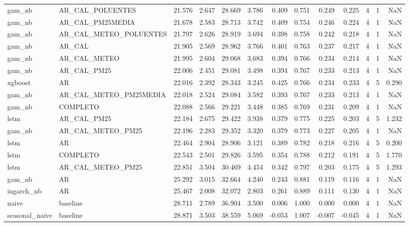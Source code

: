 \begin{tabular}{llrrrrrrrrrrr}
gam_nb & AR_CAL_POLUENTES & 21.576 & 2.647 & 28.669 & 3.786 & 0.409 & 0.751 & 0.249 & 0.225 & 4 & 1 & NaN \\
gam_nb & AR_CAL_PM25MEDIA & 21.678 & 2.583 & 28.713 & 3.742 & 0.409 & 0.754 & 0.246 & 0.224 & 4 & 1 & NaN \\
gam_nb & AR_CAL_METEO_POLUENTES & 21.797 & 2.626 & 28.919 & 3.694 & 0.398 & 0.758 & 0.242 & 0.218 & 4 & 1 & NaN \\
gam_nb & AR_CAL & 21.905 & 2.569 & 28.962 & 3.766 & 0.401 & 0.763 & 0.237 & 0.217 & 4 & 1 & NaN \\
gam_nb & AR_CAL_METEO & 21.995 & 2.604 & 29.068 & 3.683 & 0.394 & 0.766 & 0.234 & 0.214 & 4 & 1 & NaN \\
gam_nb & AR_CAL_PM25 & 22.006 & 2.451 & 29.081 & 3.498 & 0.394 & 0.767 & 0.233 & 0.213 & 4 & 1 & NaN \\
xgboost & AR & 22.016 & 2.392 & 28.343 & 3.245 & 0.425 & 0.766 & 0.234 & 0.233 & 4 & 5 & 0.290 \\
gam_nb & AR_CAL_METEO_PM25MEDIA & 22.018 & 2.524 & 29.084 & 3.582 & 0.393 & 0.767 & 0.233 & 0.213 & 4 & 1 & NaN \\
gam_nb & COMPLETO & 22.088 & 2.566 & 29.221 & 3.448 & 0.385 & 0.769 & 0.231 & 0.209 & 4 & 1 & NaN \\
lstm & AR_CAL_PM25 & 22.184 & 2.675 & 29.422 & 3.938 & 0.379 & 0.775 & 0.225 & 0.203 & 4 & 5 & 1.232 \\
gam_nb & AR_CAL_METEO_PM25 & 22.196 & 2.283 & 29.352 & 3.320 & 0.379 & 0.773 & 0.227 & 0.205 & 4 & 1 & NaN \\
lstm & AR & 22.464 & 2.904 & 28.906 & 3.121 & 0.389 & 0.782 & 0.218 & 0.216 & 4 & 5 & 0.200 \\
lstm & COMPLETO & 22.543 & 2.501 & 29.826 & 3.595 & 0.354 & 0.788 & 0.212 & 0.191 & 4 & 5 & 1.770 \\
lstm & AR_CAL_METEO_PM25 & 22.851 & 3.504 & 30.469 & 4.454 & 0.342 & 0.797 & 0.203 & 0.175 & 4 & 5 & 1.293 \\
gam_nb & AR & 25.292 & 3.015 & 32.664 & 4.240 & 0.243 & 0.881 & 0.119 & 0.116 & 4 & 1 & NaN \\
ingarch_nb & AR & 25.467 & 2.008 & 32.072 & 2.803 & 0.261 & 0.889 & 0.111 & 0.130 & 4 & 1 & NaN \\
naive & baseline & 28.711 & 2.789 & 36.904 & 3.500 & 0.006 & 1.000 & 0.000 & 0.000 & 4 & 1 & NaN \\
seasonal_naive & baseline & 28.871 & 3.503 & 38.559 & 5.069 & -0.053 & 1.007 & -0.007 & -0.045 & 4 & 1 & NaN \\
\bottomrule
\end{tabular}
